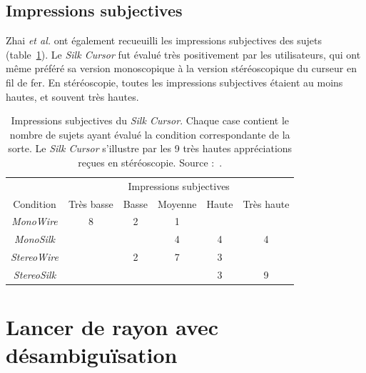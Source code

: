 \begin{appendices}
	\subsection{Impressions subjectives}
	Zhai \emph{et al.} ont également recueuilli les impressions subjectives des sujets (table~\ref{tab:silkImpr}). Le \emph{Silk Cursor} fut évalué très positivement par les utilisateurs, qui ont même préféré sa version monoscopique à la version stéréoscopique du curseur en fil de fer. En stéréoscopie, toutes les impressions subjectives étaient au moins hautes, et souvent très hautes.

	\begin{table}
	\centering
	\begin{tabular}{c | c c c c c}
							& \multicolumn{5}{c}{Impressions subjectives} \\
		Condition			& Très basse	& Basse	& Moyenne	& Haute	& Très haute \bigstrut[b] \\ \hline
		\emph{MonoWire}		& 8				& 2		& 1			&		& \bigstrut[t]	\\
		\emph{MonoSilk}		& 				& 		& 4			& 4		& 4 			\\
		\emph{StereoWire}	& 				& 2		& 7			& 3		& 	 			\\
		\emph{StereoSilk}	& 				& 		& 			& 3		& 9 			\\
	\end{tabular}
	\caption[\emph{Silk Cursor} -- impressions subjectives]{Impressions subjectives du \emph{Silk Cursor}. Chaque case contient le nombre de sujets ayant évalué la condition correspondante de la sorte. Le \emph{Silk Cursor} s'illustre par les 9 très hautes appréciations reçues en stéréoscopie. Source :~\cite{zhai1994silk}.}
	\label{tab:silkImpr}
	\end{table}





\section{Lancer de rayon avec désambiguïsation}


\end{appendices}
